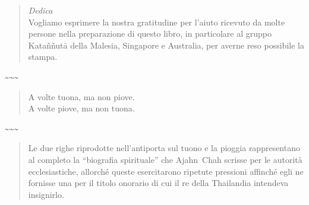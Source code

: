 \cleartorecto
\thispagestyle{empty}

\mbox{}
\vfill

\begin{quote}
\centering
\emph{Dedica}\\[0.6\baselineskip]
Vogliamo esprimere la nostra gratitudine per l’aiuto ricevuto da molte persone
nella preparazione di questo libro, in particolare al gruppo Kataññutā della
Malesia, Singapore e Australia, per averne reso possibile la stampa.

\end{quote}

{\centering \textasciitilde\space \textasciitilde\space \textasciitilde\par}

\begin{quote}
\centering
A volte tuona, ma non piove.\\
A volte piove, ma non tuona.

\end{quote}

{\centering \textasciitilde\space \textasciitilde\space \textasciitilde\par}

\begin{quote}
\centering
Le due righe riprodotte nell'antiporta
sul tuono e la pioggia
rappresentano al completo la ``biografia spirituale''
che Ajahn~Chah scrisse per le autorità ecclesiastiche,
allorché queste esercitarono ripetute pressioni
affinché egli ne fornisse una per il titolo onorario di cui
il re della Thailandia intendeva insignirlo.

\end{quote}


\vfill
\mbox{}

